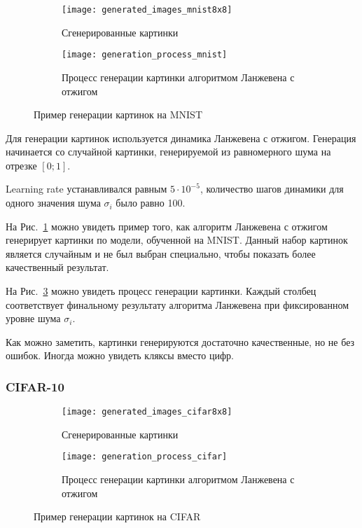 \documentclass{article}
\begin{document}
\begin{figure}
    \centering
    \begin{subfigure}[b]{0.45\textwidth}
    \texttt{[image: generated\_images\_mnist8x8]}
    \caption{Сгенерированные картинки}\label{fig:mnist8x8sample}
    \end{subfigure}
    \begin{subfigure}[b]{0.45\textwidth}
    \texttt{[image: generation\_process\_mnist]}
    \caption{Процесс генерации картинки алгоритмом Ланжевена с отжигом}\label{fig:mnist_gen}
    \end{subfigure}
    \caption{Пример генерации картинок на MNIST}
\end{figure}

Для генерации картинок используется динамика Ланжевена с отжигом.
Генерация начинается со случайной картинки, генерируемой из
равномерного шума на отрезке $[0; 1]$.

Learning rate устанавливался равным $5 \cdot 10^{-5}$, количество
шагов динамики для одного значения шума $\sigma_i$ было равно 100.

На Рис.~\ref{fig:mnist8x8sample} можно увидеть пример того, как алгоритм
Ланжевена с отжигом генерирует картинки по модели, обученной на MNIST.
Данный набор картинок является случайным и не был выбран специально, чтобы
показать более качественный результат.

На Рис.~\ref{fig:mnist_gen} можно увидеть процесс генерации картинки. Каждый
столбец соответствует финальному результату алгоритма Ланжевена при
фиксированном уровне шума $\sigma_i$.

Как можно заметить, картинки генерируются достаточно качественные, но не
без ошибок. Иногда можно увидеть кляксы вместо цифр.

\subsubsection{CIFAR-10}

\begin{figure}
    \centering
    \begin{subfigure}[b]{0.45\textwidth}
    \texttt{[image: generated\_images\_cifar8x8]}
    \caption{Сгенерированные картинки}\label{fig:cifar8x8sample}
    \end{subfigure}
    \begin{subfigure}[b]{0.45\textwidth}
    \texttt{[image: generation\_process\_cifar]}
    \caption{Процесс генерации картинки алгоритмом Ланжевена с отжигом}\label{fig:cifar_gen}
    \end{subfigure}
    \caption{Пример генерации картинок на CIFAR}
\end{figure}
\end{document}
